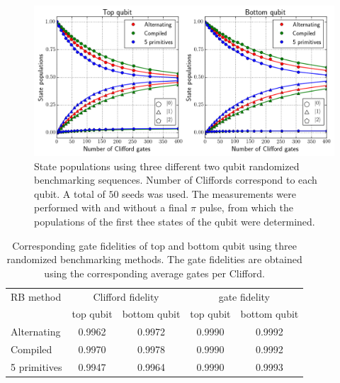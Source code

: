           \begin{figure}[tb]
            \centering
            \includegraphics[width=\textwidth]{Figures/Randomized benchmarking/RB_2Q_state_populations_notable.png}
            \caption{State populations using three different two qubit randomized benchmarking sequences. Number of Cliffords correspond to each qubit. A total of $50$ seeds was used. The measurements were performed with and without a final $\pi$ pulse, from which the populations of the first thee states of the qubit were determined.}
            \label{fig:RB 2Q state populations}
          \end{figure}


          \begin{table}
            \begin{tabular}{l c c c c}
              \toprule
              RB method     & \multicolumn{2}{c}{Clifford fidelity} & \multicolumn{2}{c}{gate fidelity}\\
              \cmidrule(lr){2-3}
              \cmidrule(lr){4-5}
                            & top qubit & bottom qubit & top qubit & bottom qubit \\
              \midrule
              Alternating   & 0.9962 & 0.9972 & 0.9990 & 0.9992 \\
              Compiled      & 0.9970 & 0.9978 & 0.9990 & 0.9992 \\
              5 primitives  & 0.9947 & 0.9964 & 0.9990 & 0.9993 \\
              \bottomrule
            \end{tabular}
            \caption{Corresponding gate fidelities of top and bottom qubit using three randomized benchmarking methods. The gate fidelities are obtained using the corresponding average gates per Clifford.}
            \label{tab:RB 2Q converted gate fidelities}
          \end{table}

